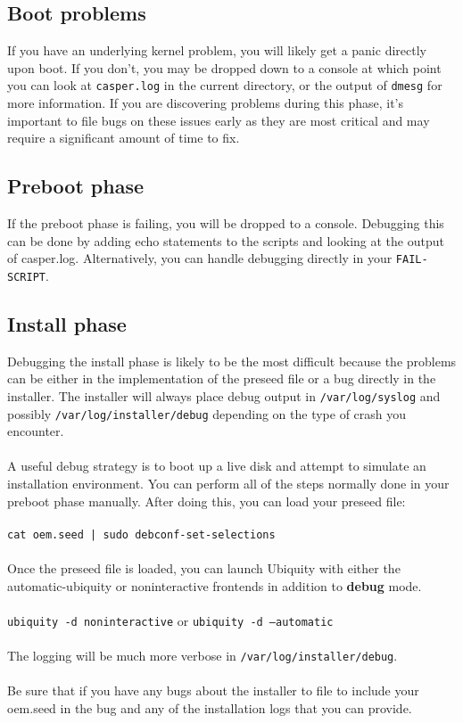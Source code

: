\documentclass[letterpaper,10pt,titlepage]{article}
\begin{document}
\subsection{Boot problems}
If you have an underlying kernel problem, you will likely get a panic directly upon boot.  If you don't, you may be dropped down to a console at which point you can look at \texttt{casper.log} in the current directory, or the output of \texttt{dmesg} for more information.  If you are discovering problems during this phase, it's important to file bugs on these issues early as they are most critical and may require a significant amount of time to fix.

\subsection{Preboot phase}
If the preboot phase is failing, you will be dropped to a console.  Debugging this can be done by adding echo statements to the scripts and looking at the output of casper.log.  Alternatively, you can handle debugging directly in your \texttt{FAIL-SCRIPT}.

\subsection{Install phase}
Debugging the install phase is likely to be the most difficult because the problems can be either in the implementation of the preseed file or a bug directly in the installer.  The installer will always place debug output in \texttt{/var/log/syslog} and possibly \texttt{/var/log/installer/debug} depending on the type of crash you encounter.
\\
\\
A useful debug strategy is to boot up a live disk and attempt to simulate an installation environment.  You can perform all of the steps normally done in your preboot phase manually.  After doing this, you can load your preseed file:
\\
\\
\texttt{cat oem.seed | sudo debconf-set-selections}
\\
\\
Once the preseed file is loaded, you can launch Ubiquity with either the automatic-ubiquity or noninteractive frontends in addition to \textbf{debug} mode.
\\
\\
\texttt{ubiquity -d noninteractive} or \texttt{ubiquity -d --automatic}
\\
\\
The logging will be much more verbose in \texttt{/var/log/installer/debug}.
\\
\\
Be sure that if you have any bugs about the installer to file to include your oem.seed in the bug and any of the installation logs that you can provide.
\end{document}
